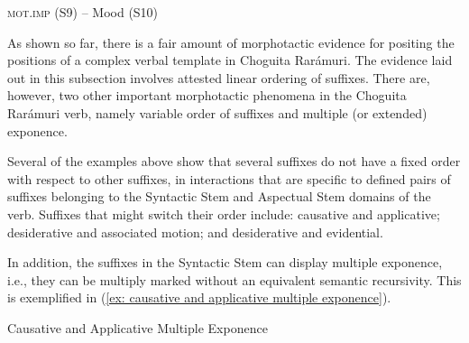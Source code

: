 \ea\label{ex: S9-S10 affix order}
{\textsc{mot.imp} (S9) -- Mood (S10)}

    \z
\z

As shown so far, there is a fair amount of morphotactic evidence for positing the positions of a complex verbal template in Choguita Rarámuri. The evidence laid out in this subsection involves attested linear ordering of suffixes. There are, however, two other important morphotactic phenomena in the Choguita Rarámuri verb, namely variable order of suffixes and multiple (or extended) exponence.

Several of the examples above show that several suffixes do not have a fixed order with respect to other suffixes, in interactions that are specific to defined pairs of suffixes belonging to the Syntactic Stem and Aspectual Stem domains of the verb. Suffixes that might switch their order include: causative and applicative; desiderative and associated motion; and desiderative and evidential.

In addition, the suffixes in the Syntactic Stem can display multiple exponence, i.e., they can be multiply marked without an equivalent semantic recursivity. This is exemplified in (\ref{ex: causative and applicative multiple exponence}).

\ea\label{ex: causative and applicative multiple exponence}
{Causative and Applicative Multiple Exponence}

